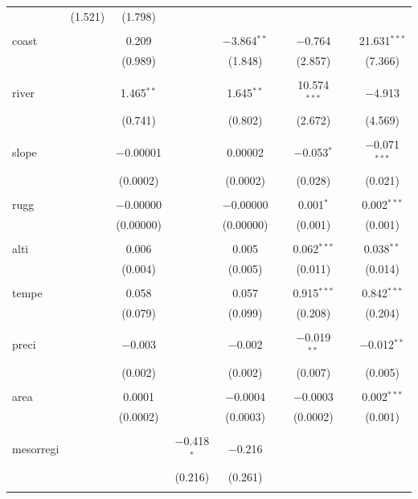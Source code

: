 \documentclass[
  a4paper,
]{article}
\begin{document}
\begin{table}[!htbp]
\begin{tabular}{@{\extracolsep{5pt}}lcccccccc}
  & (1.521) & (1.798) &  &  &  &  &  &  \\ 
  & & & & & & & & \\ 
 coast &  & 0.209 &  & $-$3.864$^{**}$ &  & $-$0.764 &  & 21.631$^{***}$ \\ 
  &  & (0.989) &  & (1.848) &  & (2.857) &  & (7.366) \\ 
  & & & & & & & & \\ 
 river &  & 1.465$^{**}$ &  & 1.645$^{**}$ &  & 10.574$^{***}$ &  & $-$4.913 \\ 
  &  & (0.741) &  & (0.802) &  & (2.672) &  & (4.569) \\ 
  & & & & & & & & \\ 
 slope &  & $-$0.00001 &  & 0.00002 &  & $-$0.053$^{*}$ &  & $-$0.071$^{***}$ \\ 
  &  & (0.0002) &  & (0.0002) &  & (0.028) &  & (0.021) \\ 
  & & & & & & & & \\ 
 rugg &  & $-$0.00000 &  & $-$0.00000 &  & 0.001$^{*}$ &  & 0.002$^{***}$ \\ 
  &  & (0.00000) &  & (0.00000) &  & (0.001) &  & (0.001) \\ 
  & & & & & & & & \\ 
 alti &  & 0.006 &  & 0.005 &  & 0.062$^{***}$ &  & 0.038$^{**}$ \\ 
  &  & (0.004) &  & (0.005) &  & (0.011) &  & (0.014) \\ 
  & & & & & & & & \\ 
 tempe &  & 0.058 &  & 0.057 &  & 0.915$^{***}$ &  & 0.842$^{***}$ \\ 
  &  & (0.079) &  & (0.099) &  & (0.208) &  & (0.204) \\ 
  & & & & & & & & \\ 
 preci &  & $-$0.003 &  & $-$0.002 &  & $-$0.019$^{**}$ &  & $-$0.012$^{**}$ \\ 
  &  & (0.002) &  & (0.002) &  & (0.007) &  & (0.005) \\ 
  & & & & & & & & \\ 
 area &  & 0.0001 &  & $-$0.0004 &  & $-$0.0003 &  & 0.002$^{***}$ \\ 
  &  & (0.0002) &  & (0.0003) &  & (0.0002) &  & (0.001) \\ 
  & & & & & & & & \\ 
 mesorregi &  &  & $-$0.418$^{*}$ & $-$0.216 &  &  &  &  \\ 
  &  &  & (0.216) & (0.261) &  &  &  &  \\ 
  & & & & & & & & \\ 

\end{tabular}
\end{table}
\end{document}
